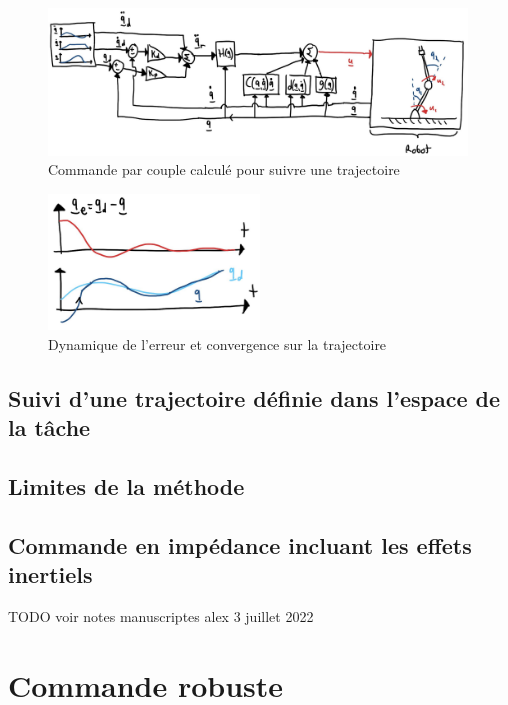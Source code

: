 \begin{figure}[htp]
	\centering
		\includegraphics[width=0.99\textwidth]{fig/computedtorquetraj.jpg}
	\caption{Commande par couple calculé pour suivre une trajectoire}
	\label{fig:computedtorquetraj}
\end{figure}

\begin{figure}[htp]
	\centering
		\includegraphics[width=0.50\textwidth]{fig/errordynamic.jpg}
	\caption{Dynamique de l'erreur et convergence sur la trajectoire}
	\label{fig:errordynamic}
\end{figure}


\subsection{Suivi d'une trajectoire définie dans l'espace de la tâche}


\subsection{Limites de la méthode}


\subsection{Commande en impédance incluant les effets inertiels }

TODO voir notes manuscriptes alex 3 juillet 2022

\newpage
\section{Commande robuste}

